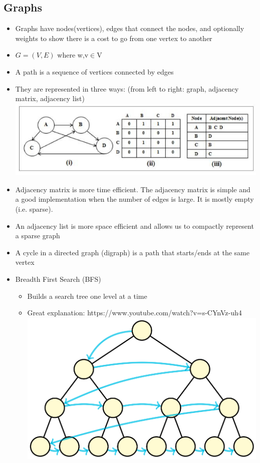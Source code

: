 \documentclass{article}
\begin{document}
\begin{multicols*}{3}
    \section{Graphs}
    \renewcommand\labelitemi{{\boldmath$\cdot$}}
    \begin{itemize}[noitemsep]
        \item Graphs have nodes(vertices), edges that connect the nodes, 
        and optionally weights to show there is a cost to go from one vertex 
        to another
        \item $G = (V,E)$ where w,v$\in$V
        \item A path is a sequence of vertices connected by edges
        \item They are represented in three ways: 
        (from left to right: graph, adjacency matrix, adjacency list)
        \includegraphics[width=\linewidth]{graphs_representation}
        \item Adjacency matrix is more time efficient.
        The adjacency matrix is simple and a good implementation 
        when the number of edges is large. It is mostly empty (i.e. sparse). 
        \item An adjacency list is more space efficient and allows us to compactly
        represent a sparse graph
        \item A cycle in a directed graph (digraph) is a path that starts/ends at the 
        same vertex
        \item Breadth First Search (BFS)
        \begin{itemize}
            \item Builds a search tree one level at a time
            \item Great explanation: https://www.youtube.com/watch?v=s-CYnVz-uh4
            \includegraphics[width=\linewidth]{bfs_traversal}

\end{itemize}
\end{itemize}
\end{multicols*}
\end{document}
